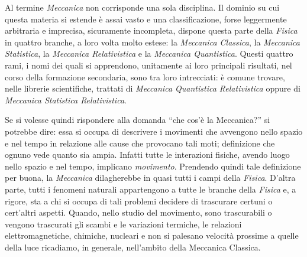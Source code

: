 \def\thesection {\arabic{section}}

\noindent Al termine {\em Meccanica} non corrisponde una sola disciplina. Il dominio
su cui questa materia si estende \`e assai vasto e una classificazione, forse leggermente
arbitraria e imprecisa, sicuramente incompleta,
dispone questa parte della {\em Fisica} in quattro branche, a loro volta molto estese:
la {\em Meccanica Classica}, la {\em Meccanica Statistica},
la {\em Meccanica Relativistica} e la {\em Meccanica Quantistica}. Questi quattro rami,
i nomi dei quali si apprendono, unitamente ai loro principali risultati,
nel corso della formazione
secondaria, sono tra loro intrecciati: \`e comune trovare, nelle librerie
scientifiche, trattati di {\em Meccanica Quantistica Relativistica}
oppure di {\em Meccanica Statistica  Relativistica}.

\noindent Se si volesse quindi rispondere alla domanda ``che cos'\`e la Meccanica?'' si potrebbe dire:
essa si occupa di descrivere i movimenti che avvengono nello spazio e nel
tempo in relazione alle cause che provocano tali moti; 
definizione che ognuno vede quanto sia ampia. Infatti tutte le
interazioni fisiche, avendo luogo
nello spazio e nel tempo, implicano {\em movimento}. Prendendo quindi tale definizione
per  buona, la {\em Meccanica} dilagherebbe in quasi tutti i campi della {\em Fisica}. 
D'altra parte, tutti i fenomeni naturali appartengono a tutte le branche della {\em Fisica} e,
a rigore, sta a chi si occupa di tali problemi decidere di trascurare
certuni o cert'altri aspetti. 
Quando, nello studio del movimento, sono trascurabili o vengono trascurati
gli scambi e le variazioni termiche, le relazioni elettromagnetiche,
chimiche, nucleari e non si palesano velocit\`a prossime a quelle della luce
ricadiamo, in generale, 
nell'ambito della Meccanica Classica.


